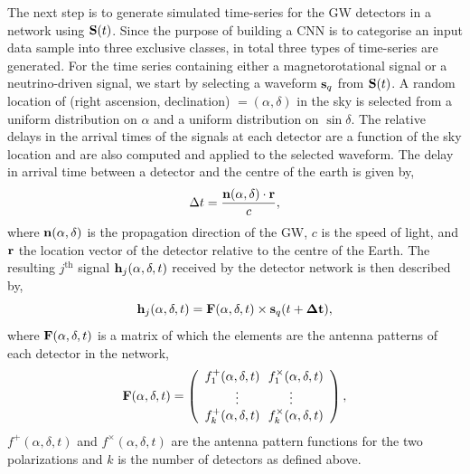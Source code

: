 \documentclass[aps,twocolumn,showpacs,groupedaddress, nofootinbib]{revtex4}  %
\begin{document}
%
%
The next step is to generate simulated time-series for the \ac{GW} detectors in
a network using $\bold{S}(t)$.
Since the purpose of building a \ac{CNN} is to categorise an input data sample
into three exclusive classes, in total three types of time-series are
generated.  For the time series containing either a magnetorotational signal or
a neutrino-driven signal, we start by selecting a waveform $\bold{s}_q$ from
$\bold{S}(t)$. A random location of (right ascension, declination) $=(\alpha,
\delta)$ in the sky is selected from a uniform distribution on $\alpha$ and a
uniform distribution on $\sin\delta$. 
%
%
The relative delays in the arrival times of the signals at each
detector are a function of the sky location and are also computed and applied
to the selected waveform. The delay in arrival time between a detector and the
centre of the earth is given by,
%
\begin{equation}\label{eq:tdetector}
\Delta t = \frac{\bold{n}(\alpha,\delta) \cdot \bold{r}}{c},
\end{equation}
%
where $\bold{n}(\alpha,\delta)$ is the propagation direction of the \ac{GW},
$c$ is the speed of light, and $\bold{r}$ the location vector of the detector
relative to the centre of the Earth. The resulting $j^{\text{th}}$ signal $\bold{h}_j(\alpha,
\delta, t)$ received by the detector network is then described by,
%
\begin{equation}\label{eq:ht2}
 \bold{h}_j(\alpha, \delta, t) = \bold{F}(\alpha, \delta, t) \times
\bold{s}_q(t+\bold{\Delta t}),
\end{equation}
%
where $\bold{F}(\alpha, \delta, t)$ is a matrix of which the elements are the antenna patterns of each detector in the network,
%
\begin{equation}\label{eq:ap}
\bold{F}(\alpha, \delta, t)= \left(\begin{array}{cc}
f_1^+(\alpha, \delta, t)~~f_1^\times(\alpha, \delta, t) \\
\vdots~~~~~~~~~~~~\vdots \\
f_k^+(\alpha, \delta, t)~~f_k^\times(\alpha, \delta, t) \\
\end{array}\right),
\end{equation}
%
$f^+(\alpha, \delta, t)$ and $f^{\times}(\alpha, \delta, t)$
are the antenna pattern functions for the two polarizations and $k$ is the
number of detectors as defined above. 
%
\end{document}
